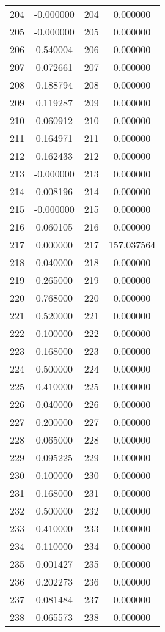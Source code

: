 \documentclass[12pt]{article}
\begin{document}
\begin{longtable}{@{}cccc@{}}
204 & -0.000000 & 204 & 0.000000 \\
205 & -0.000000 & 205 & 0.000000 \\
206 & 0.540004 & 206 & 0.000000 \\
207 & 0.072661 & 207 & 0.000000 \\
208 & 0.188794 & 208 & 0.000000 \\
209 & 0.119287 & 209 & 0.000000 \\
210 & 0.060912 & 210 & 0.000000 \\
211 & 0.164971 & 211 & 0.000000 \\
212 & 0.162433 & 212 & 0.000000 \\
213 & -0.000000 & 213 & 0.000000 \\
214 & 0.008196 & 214 & 0.000000 \\
215 & -0.000000 & 215 & 0.000000 \\
216 & 0.060105 & 216 & 0.000000 \\
217 & 0.000000 & 217 & 157.037564 \\
218 & 0.040000 & 218 & 0.000000 \\
219 & 0.265000 & 219 & 0.000000 \\
220 & 0.768000 & 220 & 0.000000 \\
221 & 0.520000 & 221 & 0.000000 \\
222 & 0.100000 & 222 & 0.000000 \\
223 & 0.168000 & 223 & 0.000000 \\
224 & 0.500000 & 224 & 0.000000 \\
225 & 0.410000 & 225 & 0.000000 \\
226 & 0.040000 & 226 & 0.000000 \\
227 & 0.200000 & 227 & 0.000000 \\
228 & 0.065000 & 228 & 0.000000 \\
229 & 0.095225 & 229 & 0.000000 \\
230 & 0.100000 & 230 & 0.000000 \\
231 & 0.168000 & 231 & 0.000000 \\
232 & 0.500000 & 232 & 0.000000 \\
233 & 0.410000 & 233 & 0.000000 \\
234 & 0.110000 & 234 & 0.000000 \\
235 & 0.001427 & 235 & 0.000000 \\
236 & 0.202273 & 236 & 0.000000 \\
237 & 0.081484 & 237 & 0.000000 \\
238 & 0.065573 & 238 & 0.000000 \\

\end{longtable}
\end{document}
